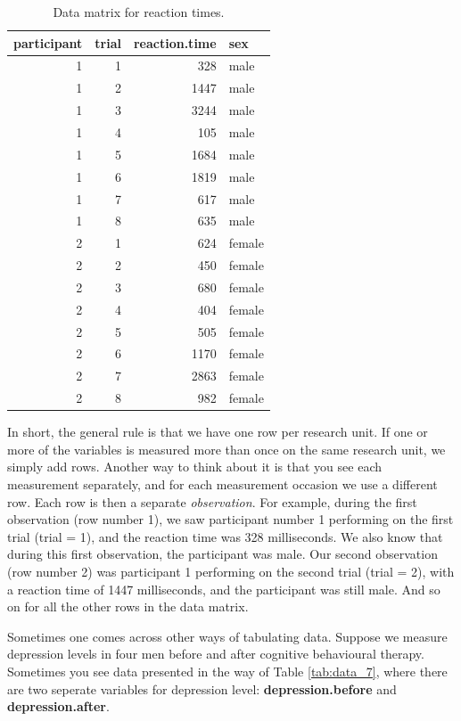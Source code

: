 \documentclass[]{report}\usepackage[]{graphicx}\usepackage[]{color}
\begin{document}
\begin{table}[ht]
\centering
\caption{Data matrix for reaction times.} 
\label{tab:data_6}
\begin{tabular}{rrrl}
  \hline
participant & trial & reaction.time & sex \\ 
  \hline
1 & 1 & 328 & male \\ 
  1 & 2 & 1447 & male \\ 
  1 & 3 & 3244 & male \\ 
  1 & 4 & 105 & male \\ 
  1 & 5 & 1684 & male \\ 
  1 & 6 & 1819 & male \\ 
  1 & 7 & 617 & male \\ 
  1 & 8 & 635 & male \\ 
  2 & 1 & 624 & female \\ 
  2 & 2 & 450 & female \\ 
  2 & 3 & 680 & female \\ 
  2 & 4 & 404 & female \\ 
  2 & 5 & 505 & female \\ 
  2 & 6 & 1170 & female \\ 
  2 & 7 & 2863 & female \\ 
  2 & 8 & 982 & female \\ 
   \hline
\end{tabular}
\end{table}



In short, the general rule is that we have one row per research unit. If one or more of the variables is measured more than once on the same research unit, we simply add rows. Another way to think about it is that you see each measurement separately, and for each measurement occasion we use a different row. Each row is then a separate \textit{observation}. For example, during the first observation (row number 1), we saw participant number 1 performing on the first trial (trial = 1), and the reaction time was 328 milliseconds. We also know that during this first observation, the participant was male. Our second observation (row number 2) was participant 1 performing on the second trial (trial = 2), with a reaction time of 1447 milliseconds, and the participant was still male. And so on for all the other rows in the data matrix. 

Sometimes one comes across other ways of tabulating data. Suppose we measure depression levels in four men before and after cognitive behavioural therapy. Sometimes you see data presented in the way of Table \ref{tab:data_7}, where there are two seperate variables for depression level: \textbf{depression.before} and \textbf{depression.after}.
\end{document}
